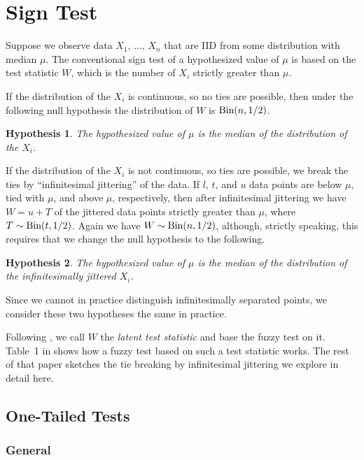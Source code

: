 \documentclass{article}
\newcommand{\BinomialDis}{\text{\upshape Bin}}
\newtheorem{hypothesis}{Hypothesis}
\begin{document}
\section{Sign Test}

Suppose we observe data $X_1$, $\ldots$, $X_n$ that are IID from some
distribution with median $\mu$.  The conventional sign test of a hypothesized
value of $\mu$ is based on the test statistic $W$, which is the number of $X_i$
strictly greater than $\mu$.

If the distribution of the $X_i$ is continuous, so no ties are possible,
then under the following null hypothesis the distribution of $W$
is $\BinomialDis(n, 1 / 2)$.
\begin{hypothesis} \label{null-sign}
The hypothesized value of $\mu$ is the median of the distribution
    of the $X_i$.
\end{hypothesis}

If the distribution of the $X_i$ is not continuous, so ties are possible,
we break the ties by ``infinitesimal jittering'' of the data.
If $l$, $t$, and $u$ data points are below $\mu$, tied with $\mu$,
and above $\mu$, respectively, then after infinitesimal jittering
we have $W = u + T$ of the
jittered data points strictly greater than $\mu$,
where $T \sim \BinomialDis(t, 1 / 2)$.
Again we have $W \sim \BinomialDis(n, 1 / 2)$,
although, strictly speaking, this requires that we change the null hypothesis
to the following.
\begin{hypothesis} \label{null-sign-jittered}
The hypothesized value of $\mu$ is the median of the distribution
    of the infinitesimally jittered $X_i$.
\end{hypothesis}
Since we cannot in practice distinguish infinitesimally separated points,
we consider these two hypotheses the same in practice.

Following \citet{thompson-geyer},
we call $W$ the \emph{latent test statistic} and base the fuzzy test
on it.  Table~1 in \citet{fuzzy-rank} shows how a fuzzy test based
on such a test statistic works.  The rest of that paper sketches the
tie breaking by infinitesimal jittering we explore in detail here.

\subsection{One-Tailed Tests}

\subsubsection{General}
\end{document}
